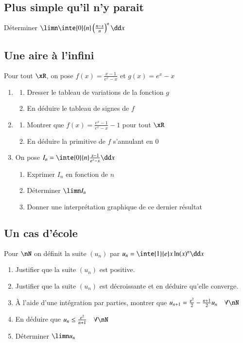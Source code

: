 \documentclass[oneside,12pt]{article}          %
\begin{document}
\subsection{Plus simple qu'il n'y parait}
Déterminer $\limn \inte{0}{n}\left(\frac{n-x}{n}\right)^n\dd x$



\subsection{Une aire à l'infini}
Pour tout $\xR$, on pose $f(x)=\frac{x-1}{e^x-x}$ et $g(x)=e^x-x$
\begin{enumerate}
    \item \begin{enumerate}
        \item Dresser le tableau de variations de la fonction $g$
        \item En déduire le tableau de signes de $f$
    \end{enumerate}
    \item \begin{enumerate}
        \item Montrer que $f(x)=\frac{e^x-1}{e^x-x}-1$ pour tout $\xR$
        \item En déduire la primitive de $f$ s'annulant  en 0
    \end{enumerate}
    \item On pose $I_n=\inte{0}{n}\frac{x-1}{e^x-x}\dd x$
    \begin{enumerate}
        \item Exprimer $I_n$ en fonction de $n$
        \item Déterminer $\limn I_n$
        \item Donner une interprétation graphique de ce dernier résultat
    \end{enumerate}
\end{enumerate}



\subsection{Un cas d'école}
Pour $\nN$ on définit la suite $(u_n)$ par $u_n=\inte{1}{e}x\ln(x)^n\dd x$
\begin{enumerate}
    \item Justifier que la suite $(u_n)$ est positive.
    \item Justifier que la suite $(u_n)$ est décroissante et en déduire qu'elle converge.
    \item À l'aide d'une intégration par parties, montrer que $u_{n+1}=\frac{e^2}{2}-\frac{n+1}{2}u_n\quad\forall\nN$
    \item En déduire que $u_n\leq\frac{e^2}{n+1}\quad\forall\nN$
    \item Déterminer $\limn u_n$
\end{enumerate}
\end{document}
